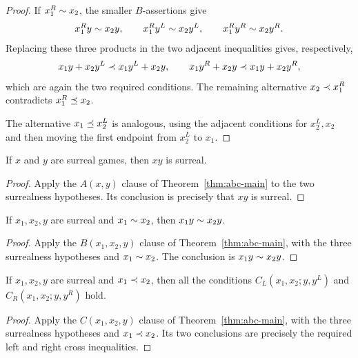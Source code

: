 \begin{proof}
  If \(x_1^R\sim x_2\), the smaller \(B\)-assertions give
  \[
    x_1^Ry\sim x_2y,\qquad
    x_1^Ry^L\sim x_2y^L,\qquad
    x_1^Ry^R\sim x_2y^R.
  \]
  Replacing these three products in the two adjacent inequalities gives,
  respectively,
  \[
    x_1y+x_2y^L\prec x_1y^L+x_2y,
    \qquad
    x_1y^R+x_2y\prec x_1y+x_2y^R,
  \]
  which are again the two required conditions.  The remaining alternative
  \(x_2\prec x_1^R\) contradicts \(x_1^R\preceq x_2\).

  The alternative \(x_1\preceq x_2^L\) is analogous, using the adjacent
  conditions for \(x_2^L,x_2\) and then moving the first endpoint from
  \(x_2^L\) to \(x_1\).
\end{proof}

\begin{theorem}
  \label{thm:conway-a}
  \leanok
  If \(x\) and \(y\) are surreal games, then \(xy\) is surreal.
\end{theorem}
\begin{proof}
  \leanok
  Apply the \(A(x,y)\) clause of Theorem~\ref{thm:abc-main} to the two
  surrealness hypotheses.  Its conclusion is precisely that \(xy\) is
  surreal.
\end{proof}

\begin{theorem}
  \label{thm:conway-b}
  \leanok
  If \(x_1,x_2,y\) are surreal and \(x_1\sim x_2\), then
  \(x_1y\sim x_2y\).
\end{theorem}
\begin{proof}
  \leanok
  Apply the \(B(x_1,x_2,y)\) clause of Theorem~\ref{thm:abc-main}, with the
  three surrealness hypotheses and \(x_1\sim x_2\).  The conclusion is
  \(x_1y\sim x_2y\).
\end{proof}

\begin{theorem}
  \label{thm:conway-c}
  \leanok
  If \(x_1,x_2,y\) are surreal and \(x_1\prec x_2\), then all the conditions
  \(C_L(x_1,x_2;y,y^L)\) and \(C_R(x_1,x_2;y,y^R)\) hold.
\end{theorem}
\begin{proof}
  \leanok
  Apply the \(C(x_1,x_2,y)\) clause of Theorem~\ref{thm:abc-main}, with the
  three surrealness hypotheses and \(x_1\prec x_2\).  Its two conclusions
  are precisely the required left and right cross inequalities.
\end{proof}

